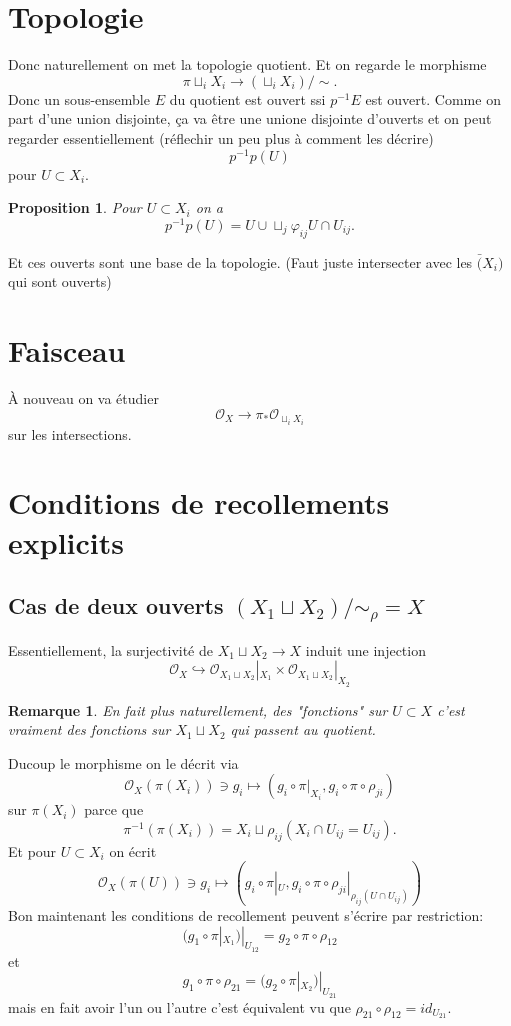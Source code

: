\documentclass[a4paper,12pt]{book}
\newcommand{\Or}{\mathcal{O}}
\theoremstyle{plain}
\newtheorem{prop}[subsection]{Proposition}
\newtheorem{rem}{Remarque}
\theoremstyle{definition}
\theoremstyle{remark}
\begin{document}
\section{Topologie}
Donc naturellement on met la topologie quotient. Et
on regarde le morphisme 
\[\pi \sqcup_i X_i\to(\sqcup_i X_i)/\sim.\]
Donc un sous-ensemble $E$ du quotient est ouvert
ssi $p^{-1}E$ est ouvert. Comme on part d'une union
disjointe, ça va être une unione disjointe d'ouverts
et on peut regarder essentiellement (réflechir
un peu plus à comment les décrire)
\[p^{-1}p(U)\]
pour $U\subset X_i$.
\begin{prop}
  Pour $U\subset X_i$ on a
  \[p^{-1}p(U)=U\cup \sqcup_j \varphi_{ij}U\cap U_{ij}.\]
\end{prop}
Et ces ouverts sont une base de la topologie. (Faut juste
intersecter avec les $\bar(X_i)$ qui sont ouverts)
\section{Faisceau}
À nouveau on va étudier 
\[\Or_X\to \pi_*\Or_{\sqcup_i X_i}\]
sur les intersections.


\section{Conditions de recollements explicits}
\subsection{Cas de deux ouverts $(X_1\sqcup X_2)/\sim_\rho=X$}
Essentiellement, la surjectivité de $X_1\sqcup X_2\to X$
induit une injection 
\[\Or_X\hookrightarrow \Or_{X_1\sqcup X_2}|_{X_1}\times \Or_{X_1\sqcup X_2}|_{X_2}\]
\begin{rem}
  En fait plus naturellement, des "fonctions" sur $U\subset X$
  c'est vraiment des fonctions sur $X_1\sqcup X_2$ qui 
  passent au quotient.
\end{rem}
Ducoup le morphisme on le décrit via 
\[\Or_{X}(\pi(X_i))\ni g_i\mapsto (g_i\circ \pi|_{X_i},g_i\circ \pi\circ \rho_{ji})\]
sur $\pi(X_i)$ parce que 
\[\pi^{-1}(\pi(X_i))=X_i\sqcup \rho_{ij}(X_i\cap U_{ij}=U_{ij}).\]
Et pour $U\subset X_i$ on écrit 
\[\Or_{X}(\pi(U))\ni g_i\mapsto (g_i\circ \pi|_{U},g_i\circ \pi\circ \rho_{ji}|_{\rho_{ij}(U\cap U_{ij})})\]
Bon maintenant les conditions de recollement peuvent s'écrire par
restriction:
\[(g_1\circ\pi|_{X_1})|_{U_{12}}=g_2\circ\pi\circ \rho_{12}\]
et 
\[g_1\circ\pi\circ \rho_{21}=(g_2\circ\pi|_{X_2})|_{U_{21}}\]
mais en fait avoir l'un ou l'autre c'est équivalent vu que 
$\rho_{21}\circ\rho_{12}=id_{U_{21}}$.
\end{document}
